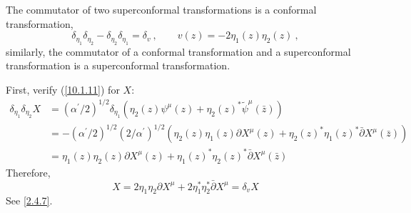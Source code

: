 The commutator of two superconformal transformations is a conformal transformation,
\begin{equation}
	\delta_{\eta_{1}}\delta_{\eta_{2}}-\delta_{\eta_{2}}\delta_{\eta_{1}}=\delta_{v}\:,\qquad
	v(z)= -2\eta_{1}(z)\eta_{2}(z) \:, \label{10.1.11}
\end{equation}
similarly, the commutator of a conformal transformation and a superconformal transformation is a superconformal transformation.
\begin{tcolorbox}[breakable]
	First, verify (\ref{10.1.11}) for $X$:
	\begin{align*}
		\delta_{\eta_{1}}\delta_{\eta_{2}}X &=  (\alpha^{\prime}/2)^{1/2}
		\delta_{\eta_{1}}(\eta_{2}(z)\psi^{\mu}(z) + \eta_{2}(z)^{\ast} \tilde{\psi}^{\mu}(\bar{z})) \\
		&=-(\alpha^{\prime}/2)^{1/2} (2/\alpha^{\prime})^{1/2}
		(\eta_{2}(z)\eta_{1}(z)\partial X^{\mu}(z) + \eta_{2}(z)^{\ast} \eta_{1}(z)^{\ast}\bar{\partial}X^{\mu}(\bar{z}))  \\
		&=
		\eta_{1}(z)\eta_{2}(z)\partial X^{\mu}(z) +
		\eta_{1}(z)^{\ast} \eta_{2}(z)^{\ast}\bar{\partial}X^{\mu}(\bar{z})
	\end{align*}
	Therefore,
	\begin{equation*}
		[\delta_{\eta_{1}},\delta_{\eta_{2}}]X= 
		2\eta_{1}\eta_{2}\partial X^{\mu} + 2\eta_{1}^{\ast} \eta_{2}^{\ast}\bar{\partial}X^{\mu}
		=\delta_{v}X
	\end{equation*}
	See \eqref{2.4.7}.
	

\end{tcolorbox}
